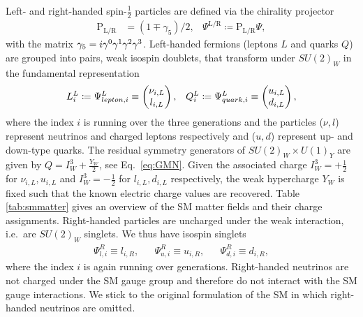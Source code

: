 Left- and right-handed spin-$\frac{1}{2}$ particles are defined via the
 chirality projector 
 \begin{align}
 \text{P}_{\text{L/R}}&=(1\mp \gamma_5)/2,& \Psi^{\text{L/R}}\coloneqq  \text{P}_{\text{L/R}} \Psi,
 \end{align}
with the matrix $\g5=i\gamma^0\gamma^1\gamma^2\gamma^3$. Left-handed fermions (leptons $L$ and quarks $Q$) are grouped into pairs, weak
isospin doublets, that transform under $SU(2)_W$ in the
fundamental representation
\begin{align}
 L_i^L \coloneqq \Psi_{lepton,i}^L  \equiv \pmqty{\nu_{i,L}\\l_{i,L}}, && Q_i^L \coloneqq \Psi_{quark,i}^L \equiv \pmqty{u_{i,L}\\d_{i,L}},
\end{align}
where the index $i$ is running over the three generations and the
particles ($\nu, l$) represent neutrinos and charged leptons
respectively and ($u, d$) represent up- and down-type
quarks. The residual symmetry generators of $SU(2)_W\times
U(1)_Y$ are given by $Q = I_W^3+\frac{Y_W}{2}$, see
Eq.~\eqref{eq:GMN}. Given the associated charge $I_W^3=+\frac{1}{2}$ for
$\nu_{i,L},u_{i,L}$ and $I_W^3=-\frac{1}{2}$ for $l_{i,L},d_{i,L}$ respectively, the weak hypercharge $Y_W$ is fixed such
that the known electric charge values are recovered. Table
\ref{tab:smmatter} gives an overview of
the SM matter fields and their charge assignments. Right-handed particles are uncharged under the weak interaction, i.e.\ are $SU(2)_W$ singlets. We thus have isospin singlets 
\begin{align}
  \Psi_{l,i}^R\equiv l_{i,R}, &&
   \Psi_{u,i}^R\equiv u_{i,R}, &&\Psi_{d,i}^R\equiv d_{i,R},
\end{align}
where the index $i$ is again running over generations. Right-handed
neutrinos are not charged under the SM
gauge group and therefore do not interact with the SM gauge
interactions. We stick to the original formulation of the SM in which right-handed
neutrinos are omitted. 


